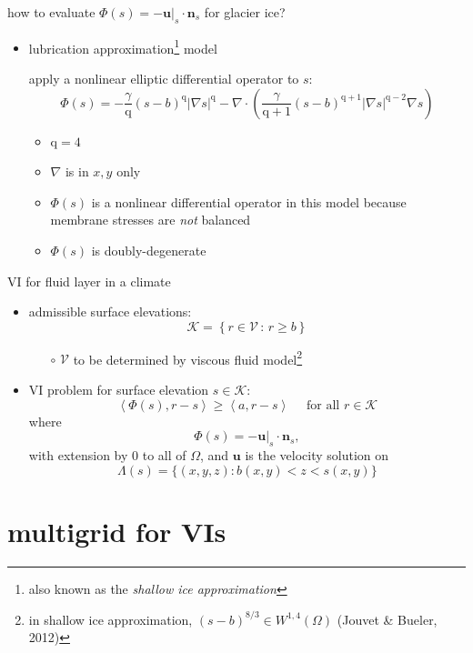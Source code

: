 \documentclass[svgnames,
               hyperref={colorlinks,citecolor=DeepPink4,linkcolor=FireBrick,urlcolor=Maroon},
               usepdftitle=false]  %
               {beamer}
\newcommand{\grad}{\nabla}
\newcommand{\bn}{\mathbf{n}}
\newcommand{\bu}{\mathbf{u}}
\newcommand{\ip}[2]{\left<#1,#2\right>}
\newcommand{\qq}{{\text{q}}}
\begin{document}
\begin{frame}{how to evaluate $\Phi(s) = - \bu|_s \cdot \bn_s$ for glacier ice?}

\begin{itemize}
\item \alert{lubrication approximation}\footnote{also known as the \emph{shallow ice approximation}} \alert{model}

apply a nonlinear elliptic differential operator to $s$:
    $$\Phi(s) = - \frac{\gamma}{\qq} (s-b)^{\qq} |\grad s|^{\qq} - \grad \cdot\left(\frac{\gamma}{\qq+1} (s-b)^{\qq+1} |\grad s|^{\qq-2} \grad s\right)$$
    \begin{itemize}
    \item $\qq = 4$
    \item $\grad$ is in $x,y$ only
    \item $\Phi(s)$ is a nonlinear \alert{differential operator} in this model because membrane stresses are \emph{not} balanced
    \item $\Phi(s)$ is doubly-degenerate
    \end{itemize}
\end{itemize}
\end{frame}


\begin{frame}{VI for fluid layer in a climate}

\begin{itemize}
\item admissible surface elevations:
    $$\mathcal{K} = \left\{r \in \mathcal{V} \,:\, r \ge b\right\}$$

    \begin{itemize}
    \item[$\circ$] $\mathcal{V}$ to be determined by viscous fluid model\footnote{in shallow ice approximation, $(s-b)^{8/3} \in W^{1,4}(\Omega)$ (Jouvet \& Bueler, 2012)}
    \end{itemize}
\item VI problem for surface elevation $s\in\mathcal{K}$:
	$$\ip{\Phi(s)}{r-s} \ge \ip{a}{r-s} \quad \text{ for all } r \in \mathcal{K}$$
where
    $$\Phi(s)=- \bu|_s \cdot \bn_s,$$
with extension by 0 to all of $\Omega$, and $\bu$ is the velocity solution on
    $$\Lambda(s) = \{(x,y,z) : b(x,y) < z < s(x,y)\}$$
\end{itemize}
\end{frame}


\section{multigrid for VIs}
\end{document}
